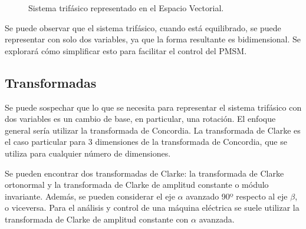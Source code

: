 \begin{figure}[H]
\begin{subfigure}[b]{3cm}
    \end{subfigure}   
    \centering
    \caption{Sistema trifásico representado en el Espacio Vectorial.}
    \label{spaceVectorGuapo}
\end{figure}


Se puede observar que el sistema trifásico, cuando está equilibrado, se puede representar con solo dos variables, ya que la forma resultante es bidimensional. Se explorará cómo simplificar esto para facilitar el control del PMSM.

\subsection{Transformadas}

Se puede sospechar que lo que se necesita para representar el sistema trifásico con dos variables es un cambio de base, en particular, una rotación. El enfoque general sería utilizar la transformada de Concordia. La transformada de Clarke es el caso particular para 3 dimensiones de la transformada de Concordia, que se utiliza para cualquier número de dimensiones.

Se pueden encontrar dos transformadas de Clarke: la transformada de Clarke ortonormal y la transformada de Clarke de amplitud constante o módulo invariante. Además, se pueden considerar el eje $\alpha$ avanzado 90º respecto al eje $\beta$, o viceversa. Para el análisis y control de una máquina eléctrica se suele utilizar la transformada de Clarke de amplitud constante con $\alpha$ avanzada.

